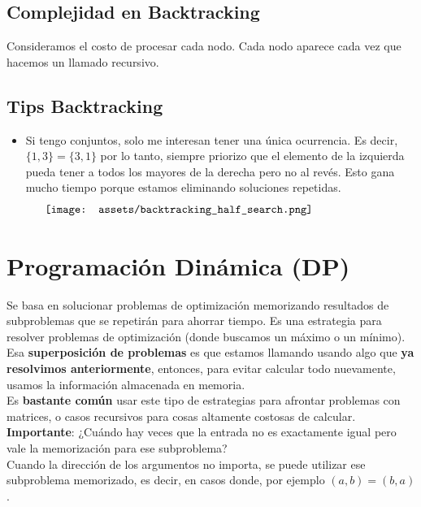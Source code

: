 \documentclass[10pt,a4paper]{article}
\begin{document}
\subsection*{Complejidad en Backtracking}
Consideramos el costo de procesar cada nodo. Cada nodo aparece cada vez que hacemos un llamado recursivo.  
\subsection*{Tips Backtracking}
\begin{itemize}
    \item Si tengo conjuntos, solo me interesan tener una única ocurrencia. Es decir, $\{1, 3\} = \{3, 1\}$ por lo tanto, siempre priorizo que el elemento de la izquierda pueda tener a todos los mayores de la derecha pero no al revés. Esto gana mucho tiempo porque estamos eliminando soluciones repetidas.
    \[\begin{minipage}[b]{0.9\textwidth}
    \texttt{[image: assets/backtracking\_half\_search.png]}
    \end{minipage}\]
\end{itemize}
\section*{Programación Dinámica (DP)}
Se basa en solucionar problemas de optimización memorizando resultados de subproblemas que se repetirán para ahorrar tiempo. Es una estrategia para resolver problemas de optimización (donde buscamos un máximo o un mínimo). \\
Esa \textbf{superposición de problemas} es que estamos llamando usando algo que \textbf{ya resolvimos anteriormente}, entonces, para evitar calcular todo nuevamente, usamos la información almacenada en memoria. \\
Es \textbf{bastante común} usar este tipo de estrategias para afrontar problemas con matrices, o casos recursivos para cosas altamente costosas de calcular. \\
\textbf{Importante}: ¿Cuándo hay veces que la entrada no es exactamente igual pero vale la memorización para ese subproblema? \\
Cuando la dirección de los argumentos no importa, se puede utilizar ese subproblema memorizado, es decir, en casos donde, por ejemplo $(a, b) = (b, a)$.
\end{document}
